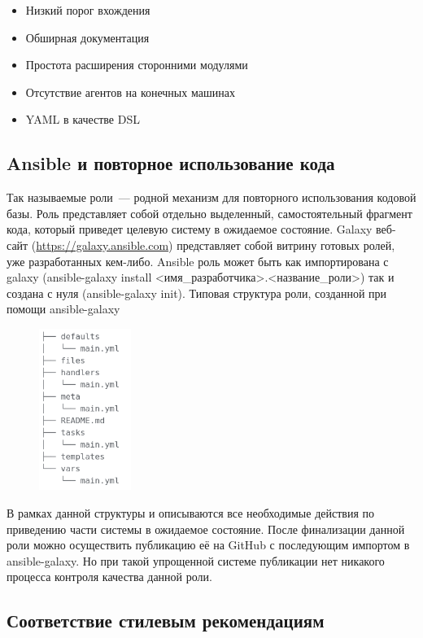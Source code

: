 \documentclass[10pt, a5paper]{article}
\begin{document}
\begin{itemize}
  \item Низкий порог вхождения
  \item Обширная документация
  \item Простота расширения сторонними модулями
  \item Отсутствие агентов на конечных машинах
  \item YAML в качестве DSL
\end{itemize}

\subsection*{Ansible и повторное использование кода}

Так называемые роли~--- родной механизм для повторного использования кодовой базы. Роль представляет собой отдельно выделенный, самостоятельный фрагмент кода, который приведет целевую систему в ожидаемое состояние.
Galaxy веб-сайт (\url{https://galaxy.ansible.com}) представляет собой витрину готовых ролей, уже разработанных кем-либо.
Ansible роль может быть как импортирована с galaxy (ansible-galaxy install \textless{}имя\_разработчика\textgreater{}.\textless{}название\_роли\textgreater{}) так и создана с нуля (ansible-galaxy init).
Типовая структура роли, созданной при помощи ansible-galaxy


\begin{figure}[h!]
  \centering
  \includegraphics[width=3cm]{05_2018_Kharkevich6.png}
  \label{Kharkevich1}
\end{figure}

В рамках данной структуры и описываются все необходимые действия по приведению части системы в ожидаемое состояние.
После финализации данной роли можно осуществить публикацию её на GitHub с последующим импортом в ansible-galaxy. Но при такой упрощенной системе публикации нет никакого процесса контроля качества данной роли.

\subsection*{Соответствие стилевым рекомендациям}
\end{document}
